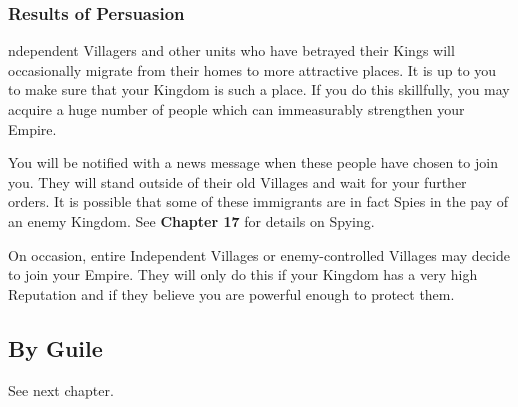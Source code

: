 \subsubsection{Results of Persuasion}

ndependent Villagers and other units who have betrayed their Kings will occasionally migrate from their homes to more attractive places. It is up to you to make sure that your Kingdom is such a place. If you do this skillfully, you may acquire a huge number of people which can immeasurably strengthen your Empire.


You will be notified with a news message when these people have chosen to join you. They will stand outside of their old Villages and wait for your further orders. It is possible that some of these immigrants are in fact Spies in the pay of an enemy Kingdom. See \textbf{Chapter 17} for details on Spying.


On occasion, entire Independent Villages or enemy-controlled Villages may decide to join your Empire. They will only do this if your Kingdom has a very high Reputation and if they believe you are powerful enough to protect them.

\subsection{By Guile}

See next chapter.